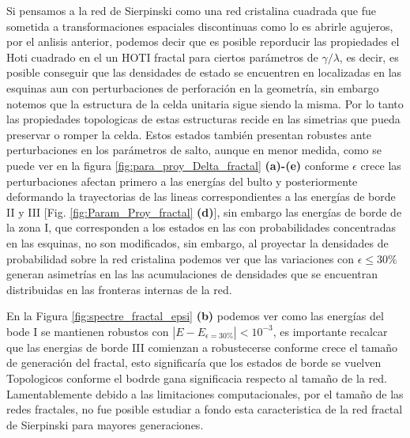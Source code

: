 Si pensamos a la red de Sierpinski como una red cristalina cuadrada que fue sometida a transformaciones espaciales discontinuas como lo es abrirle agujeros, por el anlisis anterior, podemos decir que es posible reporducir las propiedades el Hoti cuadrado en el un HOTI fractal para ciertos parámetros de $\gamma/\lambda$, es decir, es posible conseguir que las densidades de estado se encuentren en localizadas en las esquinas aun con perturbaciones de perforación en la geometría, sin embargo notemos que la estructura de la celda unitaria sigue siendo la misma. Por lo tanto las propiedades topologicas de estas estructuras recide en las simetrias que pueda preservar o romper la celda. 
Estos estados también presentan robustes ante perturbaciones en los parámetros de salto, aunque en menor medida, como se puede ver en la figura \ref{fig:para_proy_Delta_fractal} \textbf{(a)-(e)} conforme $\epsilon$ crece las perturbaciones afectan primero a las energías del bulto y posteriormente deformando la trayectorias de las lineas correspondientes a las energías de borde II y III [Fig. \ref{fig:Param_Proy_fractal} \textbf{(d)}], sin embargo las energías de borde de la zona I,  que corresponden a los estados en las con probabilidades concentradas en las esquinas, no son modificados, sin embargo, al proyectar la densidades de probabilidad sobre la red cristalina podemos ver que las variaciones con $\epsilon \leq 30\%$ generan asimetrías en las las acumulaciones de densidades que se encuentran distribuidas en las fronteras internas de la red.

En la Figura \ref{fig:spectre_fractal_epsi} \textbf{(b)} podemos ver como las energías del bode I  se mantienen robustos con $|E - E_{\epsilon = 30\%}| < 10^{-3}$, es importante recalcar que las energias de borde III comienzan a robustecerse conforme crece el tamaño de generación del fractal, esto significaría que los estados de borde se vuelven Topologicos conforme el bodrde gana significacia respecto al tamaño de la red. Lamentablemente debido a las limitaciones computacionales, por el tamaño de las redes fractales, no fue posible estudiar a fondo esta caracteristica de la red fractal de Sierpinski para mayores generaciones.







